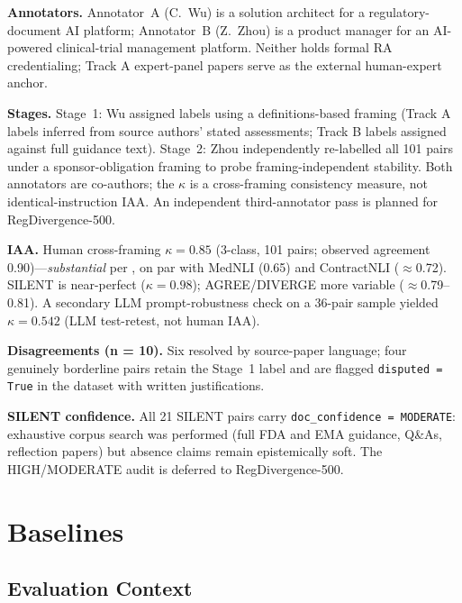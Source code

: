 \documentclass[manuscript]{acmart}
\begin{document}
\begin{revblock}
\textbf{Annotators.} Annotator~A (C.~Wu) is a solution architect for a
regulatory-document AI platform; Annotator~B (Z.~Zhou) is a product manager for
an AI-powered clinical-trial management platform. Neither holds formal RA
credentialing; Track A expert-panel papers serve as the external human-expert
anchor.

\textbf{Stages.} Stage~1: Wu assigned labels using a definitions-based framing
(Track A labels inferred from source authors' stated assessments; Track B labels
assigned against full guidance text). Stage~2: Zhou independently re-labelled
all 101 pairs under a sponsor-obligation framing to probe framing-independent
stability. Both annotators are co-authors; the $\kappa$ is a cross-framing
consistency measure, not identical-instruction IAA. An independent
third-annotator pass is planned for RegDivergence-500.

\textbf{IAA.} Human cross-framing $\kappa = 0.85$ (3-class, 101 pairs;
observed agreement 0.90)---\textit{substantial} per \citet{landis1977kappa},
on par with MedNLI (0.65) and ContractNLI ($\approx$0.72). SILENT is
near-perfect ($\kappa = 0.98$); AGREE/DIVERGE more variable ($\approx$0.79--0.81).
A secondary LLM prompt-robustness check on a 36-pair sample yielded
$\kappa = 0.542$ (LLM test-retest, not human IAA).

\textbf{Disagreements (n = 10).} Six resolved by source-paper language; four
genuinely borderline pairs retain the Stage~1 label and are flagged
\texttt{disputed = True} in the dataset with written justifications.

\textbf{SILENT confidence.} All 21 SILENT pairs carry
\texttt{doc\_confidence = MODERATE}: exhaustive corpus search was performed
(full FDA and EMA guidance, Q\&As, reflection papers) but absence claims remain
epistemically soft. The HIGH/MODERATE audit is deferred to RegDivergence-500.
\end{revblock}

\section{Baselines}

\subsection{Evaluation Context}
\label{sec:eval_context}
\end{document}
